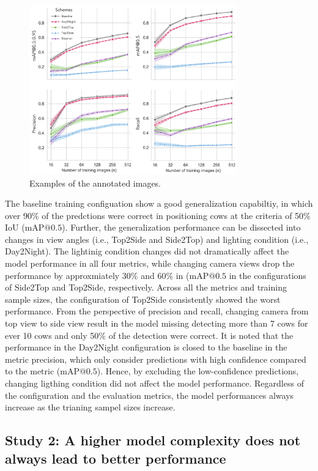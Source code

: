 \begin{figure}[H]
    \centering
    \includegraphics[width=0.8\textwidth]{figure_3.jpg}
    \caption{Examples of the annotated images.}
    \label{fig:schemes}
\end{figure}

The baseline training configuation show a good generalization capabiltiy, in which over 90\% of the predctions were correct in positioning cows at the criteria of 50\% IoU ($\text{mAP@{0.5}}$). Further, the generalization performance can be dissected into changes in view angles (i.e., Top2Side and Side2Top) and lighting condition (i.e., Day2Night). The lightinig condition changes did not dramatically affect the model performance in all four metrics, while changing camera views drop the performance by approxmiately 30\% and 60\% in ($\text{mAP@{0.5}}$ in the configurations of Side2Top and Top2Side, respectively. Across all the metrics and training sample sizes, the configuration of Top2Side consistently showed the worst performance. From the perspective of precision and recall, changing camera from top view to side view result in the model missing detecting more than 7 cows for ever 10 cows and only 50\% of the detection were correct. It is noted that the performance in the Day2Night configuration is closed to the baseline in the metric precision, which only consider predictions with high confidence compared to the metric ($\text{mAP@{0.5}}$). Hence, by excluding the low-confidence predictions, changing ligthing condition did not affect the model performance. Regardless of the configuration and the evaluation metrics, the model performances always increase as the trianing sampel sizes increase.


\subsection*{Study 2: A higher model complexity does not always lead to better performance}



